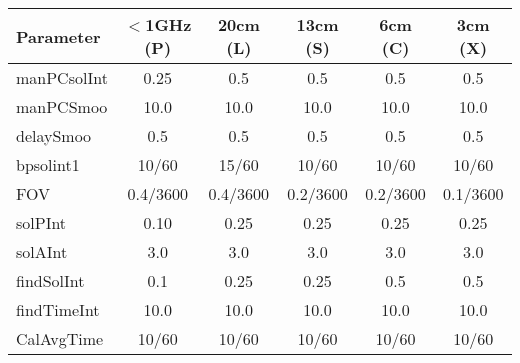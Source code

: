 \documentclass[11pt]{article}
\begin{document}
\begin{center}
\begin{tabular}{|l|c|c|c|c|c|}

\hline
Parameter     & $<$1GHz (P) & 20cm (L)  & 13cm (S)  & 6cm (C)  & 3cm  (X) \\
\hline
manPCsolInt & 0.25         & 0.5          & 0.5           & 0.5           & 0.5          \\
manPCSmoo & 10.0         & 10.0         & 10.0         & 10.0         & 10.0       \\
delaySmoo   &  0.5           & 0.5          & 0.5           & 0.5           & 0.5          \\
bpsolint1     & 10/60       & 15/60      & 10/60      & 10/60      & 10/60      \\
FOV              & 0.4/3600  & 0.4/3600 & 0.2/3600 & 0.2/3600 & 0.1/3600 \\
solPInt         & 0.10          & 0.25         & 0.25         & 0.25        & 0.25         \\
solAInt         & 3.0            & 3.0          & 3.0          & 3.0           & 3.0           \\
findSolInt     & 0.1           & 0.25         & 0.25         & 0.5         & 0.5         \\
findTimeInt  & 10.0          & 10.0        & 10.0        & 10.0        & 10.0        \\
CalAvgTime & 10/60       & 10/60      & 10/60      & 10/60      & 10/60     \\
\hline

\end{tabular}
\end{center}
\end{document}

